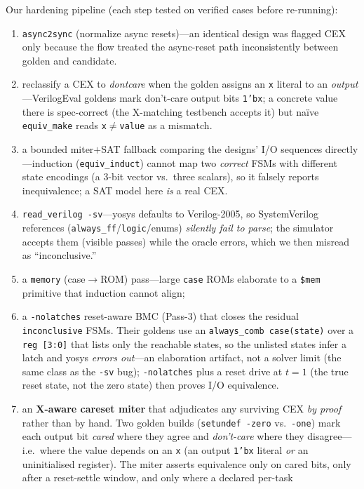 \documentclass[10pt]{article}
\newcommand{\code}[1]{\texttt{#1}}
\begin{document}
Our hardening pipeline (each step tested on verified cases before re-running):
\begin{enumerate}[leftmargin=*,topsep=2pt,itemsep=1pt]
\item \code{async2sync} (normalize async resets)---an identical design was flagged CEX only because
the flow treated the async-reset path inconsistently between golden and candidate.
\item reclassify a CEX to \emph{dontcare} when the golden assigns an \code{x} literal to an
\emph{output}---VerilogEval goldens mark don't-care output bits \code{1'bx}; a concrete value there is
spec-correct (the X-matching testbench accepts it) but na\"ive \code{equiv\_make} reads
\code{x}$\ne$\code{value} as a mismatch.
\item a bounded miter$+$SAT fallback comparing the designs' I/O sequences directly---induction
(\code{equiv\_induct}) cannot map two \emph{correct} FSMs with different state encodings (a 3-bit
vector vs.\ three scalars), so it falsely reports inequivalence; a SAT model here \emph{is} a real CEX.
\item \code{read\_verilog -sv}---yosys defaults to Verilog-2005, so SystemVerilog references
(\code{always\_ff}/\code{logic}/enums) \emph{silently fail to parse}; the simulator accepts them
(visible passes) while the oracle errors, which we then misread as ``inconclusive.''
\item a \code{memory} (case$\to$ROM) pass---large \code{case} ROMs elaborate to a \code{\$mem}
primitive that induction cannot align;
\item a \code{-nolatches} reset-aware BMC (Pass-3) that closes the residual \code{inconclusive}
FSMs. Their goldens use an \code{always\_comb case(state)} over a \code{reg [3:0]} that lists only the
reachable states, so the unlisted states infer a latch and yosys \emph{errors out}---an elaboration
artifact, not a solver limit (the same class as the \code{-sv} bug); \code{-nolatches} plus a reset
drive at $t{=}1$ (the true reset state, not the zero state) then proves I/O equivalence.
\item an \textbf{X-aware careset miter} that adjudicates any surviving CEX \emph{by proof} rather than
by hand. Two golden builds (\code{setundef -zero} vs.\ \code{-one}) mark each output bit \emph{cared}
where they agree and \emph{don't-care} where they disagree---i.e.\ where the value depends on an
\code{x} (an output \code{1'bx} literal \emph{or} an uninitialised register). The miter asserts
equivalence only on cared bits, only after a reset-settle window, and only where a declared per-task

\end{enumerate}
\end{document}
